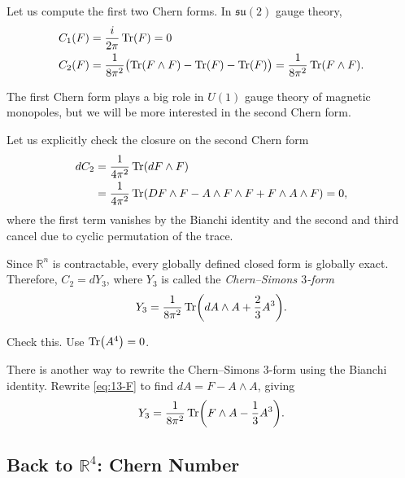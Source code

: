 Let us compute the first two Chern forms.
In $\mathfrak{su}(2)$ gauge theory,
\begin{align}
  C_1(F) &= \frac{i}{2 \pi} \Tr(F) = 0 \\
  C_2(F) &= \frac{1}{8 \pi^2} \bigl( \Tr(F \wedge F) - \Tr(F) - \Tr(F) \bigr) = \frac{1}{8 \pi^2} \Tr(F \wedge F).
\end{align}

The first Chern form plays a big role in $U(1)$ gauge theory of magnetic monopoles, but we will be more interested in the second Chern form.

Let us explicitly check the closure on the second Chern form
\begin{align}
  d C_2 &= \frac{1}{4 \pi^2} \Tr(d F \wedge F) \\
	&= \frac{1}{4 \pi^2} \Tr(D F \wedge F - A \wedge F \wedge F + F \wedge A \wedge F) = 0,
\end{align}
where the first term vanishes by the Bianchi identity and the second and third cancel due to cyclic permutation of the trace.

Since $\mathbb{R}^n$ is contractable, every globally defined closed form is globally exact.
Therefore, $C_2 = d Y_3$, where $Y_3$ is called the \emph{Chern--Simons $3$-form}
\begin{equation}
  Y_3 = \frac{1}{8\pi ^2} \Tr(d A \wedge A + \frac{2}{3} A^3).
\end{equation}
\begin{exercise}
  Check this. Use $\Tr(A^4) = 0$.
\end{exercise}

There is another way to rewrite the Chern--Simons $3$-form using the Bianchi identity.
Rewrite \eqref{eq:13-F} to find $d A = F - A \wedge A$, giving
\begin{equation}
  Y_3 = \frac{1}{8 \pi^2} \Tr(F \wedge A - \frac{1}{3} A^3).
\end{equation}

\subsection{Back to \texorpdfstring{$\mathbb{R}^4$}{Four Dimensions}: Chern Number}%
\label{sub:back_to}

